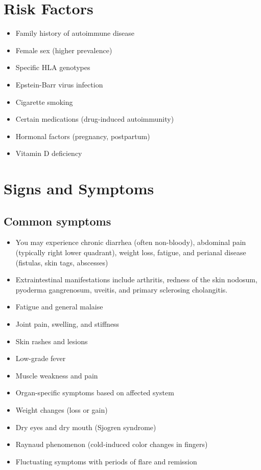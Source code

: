 \section{Risk Factors}

\begin{itemize}[noitemsep]
  \item Family history of autoimmune disease
  \item Female sex (higher prevalence)
  \item Specific HLA genotypes
  \item Epstein-Barr virus infection
  \item Cigarette smoking
  \item Certain medications (drug-induced autoimmunity)
  \item Hormonal factors (pregnancy, postpartum)
  \item Vitamin D deficiency
\end{itemize}
\section{Signs and Symptoms}

\subsection{Common symptoms}
\begin{itemize}[noitemsep]
  \item You may experience chronic diarrhea (often non-bloody), abdominal pain (typically right lower quadrant), weight loss, fatigue, and perianal disease (fistulas, skin tags, abscesses)
  \item Extraintestinal manifestations include arthritis, redness of the skin nodosum, pyoderma gangrenosum, uveitis, and primary sclerosing cholangitis.
  \item Fatigue and general malaise
  \item Joint pain, swelling, and stiffness
  \item Skin rashes and lesions
  \item Low-grade fever
  \item Muscle weakness and pain
  \item Organ-specific symptoms based on affected system
  \item Weight changes (loss or gain)
  \item Dry eyes and dry mouth (Sjogren syndrome)
  \item Raynaud phenomenon (cold-induced color changes in fingers)
  \item Fluctuating symptoms with periods of flare and remission
\end{itemize}

